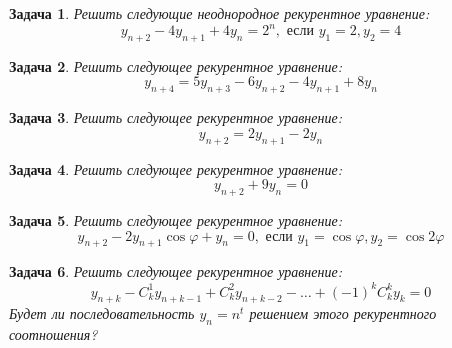 \documentclass[12pt, a4paper]{article}
\newtheorem{problem}{Задача}
\begin{document}
\begin{problem}
Решить следующие неоднородное рекурентное уравнение:
\[y_{n+2} - 4 y_{n+1} + 4 y_n = 2^n, \text{ если } y_1 = 2, y_2 = 4\] 
\begin{sol}

\end{sol}
\end{problem}



\begin{problem}
Решить следующее рекурентное уравнение:
\[y_{n+4} = 5 y_{n+3} - 6 y_{n+2} - 4 y_{n+1} + 8 y_n\]
\begin{sol}

\end{sol}
\end{problem}


\begin{problem}
Решить следующее рекурентное уравнение:
\[y_{n+2} = 2 y_{n+1} - 2 y_n\]
\begin{sol}

\end{sol}
\end{problem}


\begin{problem}
Решить следующее рекурентное уравнение:
\[y_{n+2} + 9 y_{n} = 0\]
\begin{sol}

\end{sol}
\end{problem}



\begin{problem}
Решить следующее рекурентное уравнение:
\[y_{n+2} - 2 y_{n+1} \cos{\varphi} + y_n = 0, \text{ если } y_1 = \cos{\varphi}, y_2 = \cos{2\varphi}\]
\begin{sol}

\end{sol}
\end{problem}



\begin{problem}
Решить следующее рекурентное уравнение:
\[y_{n+k} - C_k^1 y_{n+k-1} + C_k^2 y_{n+k-2} - \ldots + (-1)^k C_k^k y_k = 0\] 
Будет ли последовательность $y_n = n^t$ решением этого рекурентного соотношения?
\begin{sol}

\end{sol}
\end{problem}
\end{document}
